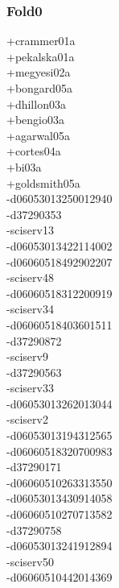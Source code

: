 \begin{multicols}{4}
\subsubsection*{Fold0}
+crammer01a\\
+pekalska01a\\
+megyesi02a\\
+bongard05a\\
+dhillon03a\\
+bengio03a\\
+agarwal05a\\
+cortes04a\\
+bi03a\\
+goldsmith05a\\
-d06053013250012940\\
-d37290353\\
-sciserv13\\
-d06053013422114002\\
-d06060518492902207\\
-sciserv48\\
-d06060518312200919\\
-sciserv34\\
-d06060518403601511\\
-d37290872\\
-sciserv9\\
-d37290563\\
-sciserv33\\
-d06053013262013044\\
-sciserv2\\
-d06053013194312565\\
-d06060518320700983\\
-d37290171\\
-d06060510263313550\\
-d06053013430914058\\
-d06060510270713582\\
-d37290758\\
-d06053013241912894\\
-sciserv50\\
-d06060510442014369\\

\end{multicols}
